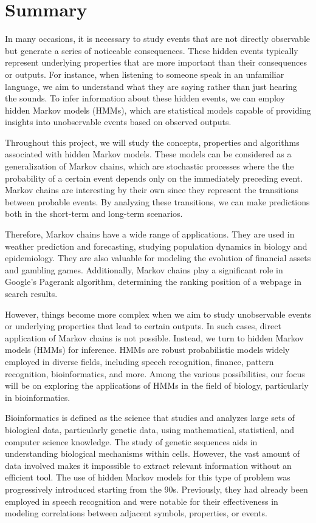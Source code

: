 \chapter*{Summary}
In many occasions, it is necessary to study events that are not directly observable but generate a series of noticeable consequences. These hidden events typically represent underlying properties that are more important than their consequences or outputs. For instance, when listening to someone speak in an unfamiliar language, we aim to understand what they are saying rather than just hearing the sounds. To infer information about these hidden events, we can employ hidden Markov models (HMMs), which are statistical models capable of providing insights into unobservable events based on observed outputs.

Throughout this project, we will study the concepts, properties and algorithms associated with hidden Markov models. These models can be considered as a generalization of Markov chains, which are stochastic processes where the the probability of a certain event depends only on the immediately preceding event. Markov chains are interesting by their own since they represent the transitions between probable events. By analyzing these transitions, we can make predictions both in the short-term and long-term scenarios. 

Therefore, Markov chains have a wide range of applications. They are used in weather prediction and forecasting, studying population dynamics in biology and epidemiology. They are also valuable for modeling the evolution of financial assets and gambling games. Additionally, Markov chains play a significant role in Google's Pagerank algorithm, determining the ranking position of a webpage in search results.

However, things become more complex when we aim to study unobservable events or underlying properties that lead to certain outputs. In such cases, direct application of Markov chains is not possible. Instead, we turn to hidden Markov models (HMMs) for inference. HMMs are robust probabilistic models widely employed in diverse fields, including speech recognition, finance, pattern recognition, bioinformatics, and more. Among the various possibilities, our focus will be on exploring the applications of HMMs in the field of biology, particularly in bioinformatics.

Bioinformatics is defined as the science that studies and analyzes large sets of biological data, particularly genetic data, using mathematical, statistical, and computer science knowledge. The study of genetic sequences aids in understanding biological mechanisms within cells. However, the vast amount of data involved makes it impossible to extract relevant information without an efficient tool. The use of hidden Markov models for this type of problem was progressively introduced starting from the 90s. Previously, they had already been employed in speech recognition and were notable for their effectiveness in modeling correlations between adjacent symbols, properties, or events.

